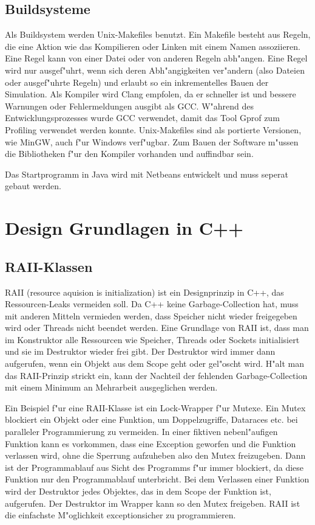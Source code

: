 \documentclass[14pt, a4paper]{report}
\begin{document}
\section{Buildsysteme}
Als Buildsystem werden Unix-Makefiles benutzt. Ein Makefile besteht aus Regeln, die eine
Aktion wie das Kompilieren oder Linken mit einem Namen assoziieren. Eine Regel kann von
einer Datei oder von anderen Regeln abh"angen. Eine Regel wird nur ausgef"uhrt, wenn 
sich deren Abh"angigkeiten ver"andern (also Dateien oder ausgef"uhrte Regeln) und erlaubt
so ein inkrementelles Bauen
der Simulation. Als Kompiler wird Clang empfolen, da er schneller ist und bessere
Warnungen oder Fehlermeldungen ausgibt als GCC. W"ahrend des Entwicklungsprozesses 
wurde GCC verwendet, damit das Tool Gprof zum Profiling verwendet werden konnte.
Unix-Makefiles sind als portierte Versionen, wie MinGW, auch f"ur Windows verf"ugbar. 
Zum Bauen
der Software m"ussen die Bibliotheken f"ur den Kompiler vorhanden und auffindbar sein.

Das Startprogramm in Java wird mit Netbeans entwickelt und muss seperat gebaut werden.

\chapter{Design Grundlagen in C++}
\section{RAII-Klassen} \label{RAII}
RAII (resource aquision is initialization) ist ein Designprinzip in C++, das 
Ressourcen-Leaks vermeiden soll. Da C++ keine Garbage-Collection hat, muss mit
anderen Mitteln vermieden werden, 
dass Speicher nicht wieder freigegeben wird oder Threads  nicht
beendet werden. Eine Grundlage von RAII ist, dass man im Konstruktor alle Ressourcen
wie Speicher, Threads oder Sockets initialisiert und sie im Destruktor wieder frei gibt.
Der Destruktor wird immer dann aufgerufen, wenn ein Objekt aus dem Scope geht oder
gel"oscht wird. H"alt man das RAII-Prinzip strickt ein, kann der Nachteil der fehlenden
Garbage-Collection mit einem Minimum an Mehrarbeit ausgeglichen werden. 

Ein Beispiel f"ur eine RAII-Klasse ist ein Lock-Wrapper f"ur Mutexe. Ein Mutex blockiert ein Objekt
oder eine Funktion, um Doppelzugriffe, Dataraces etc. bei paralleler Programmierung
zu vermeiden. 
In einer fiktiven nebenl"aufigen Funktion kann es vorkommen, dass eine Exception geworfen und die
Funktion verlassen wird, ohne die Sperrung aufzuheben also den Mutex freizugeben. 
Dann ist der Programmablauf 
aus Sicht des Programms f"ur immer blockiert, da diese Funktion nur den Programmablauf
unterbricht. Bei dem Verlassen einer Funktion wird der Destruktor jedes Objektes, das
in dem Scope der Funktion ist, aufgerufen. Der Destruktor im Wrapper kann so den Mutex freigeben.
RAII ist die einfachste M"oglichkeit exceptionsicher zu programmieren. 
\end{document}
